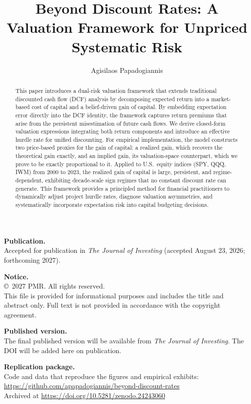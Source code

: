 \documentclass[12pt]{article}
\title{Beyond Discount Rates: A Valuation Framework for Unpriced Systematic Risk}
\author{Agisilaos Papadogiannis}
\date{}
\begin{document}
\maketitle
\begin{abstract}
This paper introduces a dual-risk valuation framework that extends traditional discounted cash flow (DCF) analysis by decomposing expected return into a market-based cost of capital and a belief-driven gain of capital. By embedding expectation error directly into the DCF identity, the framework captures return premiums that arise from the persistent misestimation of future cash flows. We derive closed-form valuation expressions integrating both return components and introduce an effective hurdle rate for unified discounting. For empirical implementation, the model constructs two price-based proxies for the gain of capital: a realized gain, which recovers the theoretical gain exactly, and an implied gain, its valuation-space counterpart, which we prove to be exactly proportional to it. Applied to U.S.\ equity indices (SPY, QQQ, IWM) from 2000 to 2023, the realized gain of capital is large, persistent, and regime-dependent, exhibiting decade-scale sign regimes that no constant discount rate can generate. This framework provides a principled method for financial practitioners to dynamically adjust project hurdle rates, diagnose valuation asymmetries, and systematically incorporate expectation risk into capital budgeting decisions.
\end{abstract}

\vspace{1.5em}
\noindent\textbf{Publication.}\\
Accepted for publication in \textit{The Journal of Investing} (accepted August 23, 2026; forthcoming 2027).

\noindent\textbf{Notice.}\\
\copyright\ 2027 PMR. All rights reserved.\\
This file is provided for informational purposes and includes the title and abstract only. Full text is not provided in accordance with the copyright agreement.

\noindent\textbf{Published version.}\\
The final published version will be available from \textit{The Journal of Investing}. The DOI will be added here on publication.

\noindent\textbf{Replication package.}\\
Code and data that reproduce the figures and empirical exhibits:\\
\url{https://github.com/apapadogiannis/beyond-discount-rates}\\
Archived at \url{https://doi.org/10.5281/zenodo.24243060}
\end{document}
